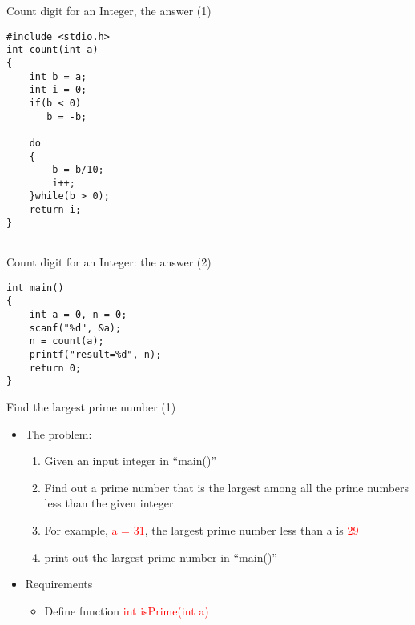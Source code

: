 \ifx\answer\undefined
\begin{frame}[fragile]{Count digit for an Integer, the answer (1)}
\vspace{-0.1in}
\begin{lstlisting}[xleftmargin=0.05\linewidth, linewidth=0.9\linewidth]
#include <stdio.h>
int count(int a)
{
    int b = a;
    int i = 0;
    if(b < 0)
       b = -b;

    do
    {
        b = b/10;
        i++;
    }while(b > 0);
    return i;
}


\end{lstlisting}
\end{frame}
\fi

\ifx\answer\undefined
\begin{frame}[fragile]{Count digit for an Integer: the answer (2)}
\vspace{-0.1in}
\begin{lstlisting}[xleftmargin=0.05\linewidth, linewidth=0.9\linewidth, firstnumber=23]
int main()
{
    int a = 0, n = 0;
    scanf("%d", &a);
    n = count(a);
    printf("result=%d", n);
    return 0;
}

\end{lstlisting}
\end{frame}
\fi

\begin{frame}{Find the largest prime number (1)}

\begin{itemize}
	\item {The problem:}
	\begin{enumerate}
		\item {Given an input integer in ``main()''}
		\item {Find out a prime number that is the largest among all the prime numbers less than the given integer}
		\item {For example, \textcolor{red}{a = 31}, the largest prime number less than a is \textcolor{red}{29}}
		\item {print out the largest prime number in ``main()''}
	\end{enumerate}
\end{itemize}
\begin{itemize}
	\item {Requirements}
	\begin{itemize}
		\item {Define function \textcolor{red}{int isPrime(int a)}}
	\end{itemize}
\end{itemize}

\end{frame}

